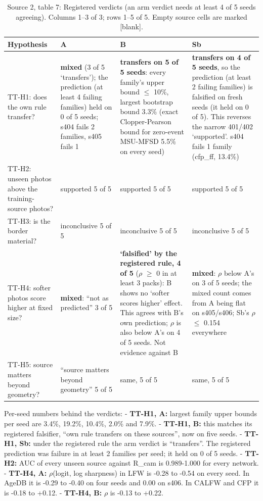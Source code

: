 \documentclass[10pt,twocolumn,letterpaper]{article}
\begin{document}
\begin{table}[p]
\centering\small
\caption{Source 2, table 7: Registered verdicts (an arm verdict needs at least 4 of 5 seeds agreeing). Columns 1--3 of 3; rows 1--5 of 5. Empty source cells are marked {[}blank{]}.}
\label{tab:transfer-2.7.1.0}
\begin{tabularx}{\textwidth}{>{\raggedright\arraybackslash}p{}>{\raggedright\arraybackslash}X>{\raggedright\arraybackslash}X>{\raggedright\arraybackslash}X}
\toprule
Hypothesis & A & B & Sb \\
\midrule
TT-H1: does the own rule transfer? & \textbf{mixed} (3 of 5 `transfers'); the prediction (at least 4 failing families) held on 0 of 5 seeds; s404 fails 2 families, s405 fails 1 & \textbf{transfers on 5 of 5 seeds}: every family's upper bound \(\le\) 10\%, largest bootstrap bound 3.3\% (exact Clopper-Pearson bound for zero-event MSU-MFSD 5.5\% on every seed) & \textbf{transfers on 4 of 5 seeds}, so the prediction (at least 2 failing families) is falsified on fresh seeds (it held on 0 of 5). This reverses the narrow 401/402 `supported'. s404 fails 1 family (cfp\_ff, 13.4\%) \\
TT-H2: unseen photos above the training-source photos? & supported 5 of 5 & supported 5 of 5 & supported 5 of 5 \\
TT-H3: is the border material? & inconclusive 5 of 5 & inconclusive 5 of 5 & inconclusive 5 of 5 \\
TT-H4: softer photos score higher at fixed size? & \textbf{mixed}: ``not as predicted'' 3 of 5 & \textbf{`falsified' by the registered rule, 4 of 5} (\(\rho\) \(\ge\) 0 in at least 3 packs): B shows no `softer scores higher' effect. This agrees with B's own prediction; \textbar{}\(\rho\)\textbar{} is also below A's on 4 of 5 seeds. Not evidence against B & \textbf{mixed}: \textbar{}\(\rho\)\textbar{} below A's on 3 of 5 seeds; the mixed count comes from A being flat on s405/s406; Sb's \textbar{}\(\rho\)\textbar{} \(\le\) 0.154 everywhere \\
TT-H5: source matters beyond geometry? & ``source matters beyond geometry'' 5 of 5 & same, 5 of 5 & same, 5 of 5 \\
\bottomrule
\end{tabularx}
\end{table}


Per-seed numbers behind the verdicts: - \textbf{TT-H1, A:} largest family upper bounds per seed are 3.4\%, 19.2\%, 10.4\%, 2.0\% and 7.9\%. - \textbf{TT-H1, B:} this matches its registered falsifier, ``own rule transfers on these sources'', now on five seeds. - \textbf{TT-H1, Sb:} under the registered rule the arm verdict is ``transfers''. The registered prediction was failure in at least 2 families per seed; it held on 0 of 5 seeds. - \textbf{TT-H2:} AUC of every unseen source against R\_cam is 0.989-1.000 for every network. - \textbf{TT-H4, A:} \(\rho\)(logit, log sharpness) in LFW is -0.28 to -0.54 on every seed. In AgeDB it is -0.29 to -0.40 on four seeds and 0.00 on s406. In CALFW and CFP it is -0.18 to +0.12. - \textbf{TT-H4, B:} \(\rho\) is -0.13 to +0.22.
\end{document}
